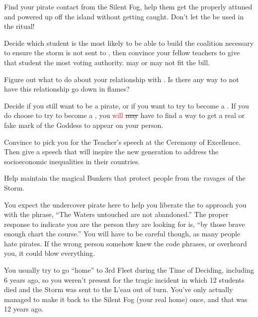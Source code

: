 \documentclass[char]{GL2020}
\begin{document}
\begin{itemz}
	\item Find your pirate contact from the Silent Fog, help them get the properly attuned and powered up \iNet{} off the island without getting caught. Don't let the \iNet{} be used in the ritual!
	\item Decide which \pShip{} student is the most likely to be able to build the coalition necessary to ensure the storm is not sent to \pShip{}, then convince your fellow teachers to give that student the most voting authority. \cWarlordDaughter{} may or may not fit the bill.
	\item Figure out what to do about your relationship with \cPrince{}. Is there any way to not have this relationship go down in flames?
	\item Decide if you still want to be a pirate, or if you want to try to become a \cPirate{\cleric}. If you do choose to try to become a \cPirate{\cleric}, you \textcolor{red}{will} \sout{may} have to find a way to get a real or fake mark of the Goddess to appear on your person.
	\item Convince \cMusic{} to pick you for the Teacher's speech at the Ceremony of Excellence. Then give a speech that will inspire the new generation to address the socioeconomic inequalities in their countries.
	\item Help \cBunker{} maintain the magical Bunkers that protect people from the ravages of the Storm.

\end{itemz}

\begin{itemz}[Notes]
	\item You expect the undercover pirate here to help you liberate the \iNet{} to approach you with the phrase, ``The Waters untouched are not abandoned.'' The proper response to indicate you are the person they are looking for is, ``by those brave enough chart the course.'' You will have to be careful though, as many people hate pirates. If the wrong person somehow knew the code phrases, or overheard you, it could blow everything.
	\item You usually try to go ``home'' to 3rd Fleet during the Time of Deciding, including 6 years ago, so you weren't present for the tragic incident in which 12 students died and the Storm was sent to the L'eau out of turn. You've only actually managed to make it back to the Silent Fog (your real home) once, and that was 12 years ago.
\end{itemz}
\end{document}
